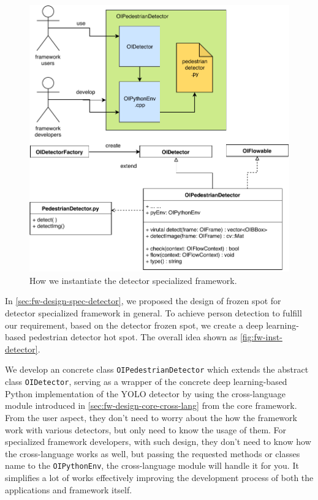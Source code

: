 \begin{figure}
    \centering
    \includegraphics[scale=0.8]{figures/framework_inst_detector.pdf}
    \caption{How we instantiate the detector specialized framework.}
    \label{fig:fw-inst-detector}
\end{figure}

In \autoref{sec:fw-design-spec-detector}, we proposed the design of frozen spot
for detector specialized framework in general. To achieve person
detection to fulfill our requirement, based on the detector frozen spot, we
create a deep learning-based pedestrian detector hot spot. The overall idea
shown as \autoref{fig:fw-inst-detector}.

We develop an concrete class \texttt{OIPedestrianDetector} which extends the
abstract class \texttt{OIDetector}, serving as a wrapper of the concrete deep
learning-based Python implementation of the YOLO detector by using the
cross-language module introduced in \autoref{sec:fw-design-core-cross-lang} from
the core framework. From the user aspect, they don't need to worry about the
how the framework work with various detectors, but only need to know
the usage of them. For specialized framework developers, with such design, they
don't need to know how the cross-language works as well, but passing the
requested methods or classes name to the \texttt{OIPythonEnv}, the
cross-language module will handle it for you. It simplifies a lot of works
effectively improving the development process of both the applications and
framework itself.

